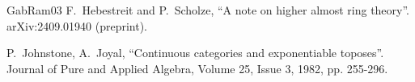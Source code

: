 \documentclass[11pt,leqno]{amsart}
\numberwithin{equation}{section}
\begin{document}
\begin{thebibliography}{GabRam03}
 F.~Hebestreit and P.~Scholze, ``A note on higher almost ring theory''. arXiv:2409.01940 (preprint).


P.~Johnstone, A.~Joyal, ``Continuous categories and exponentiable toposes''. Journal of Pure and Applied Algebra, Volume 25, Issue 3, 1982, pp. 255-296.












\end{thebibliography}
\end{document}

